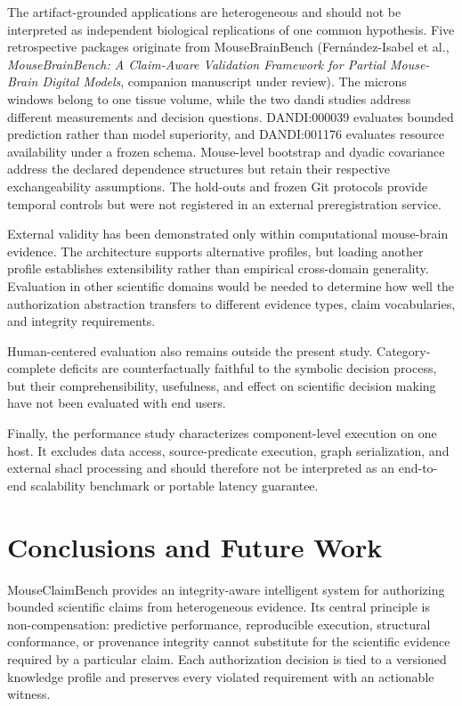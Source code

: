 \documentclass[11pt,a4paper]{article}
\newcommand{\MouseBrainBenchCompanion}{Fern\'andez-Isabel et al., \emph{MouseBrainBench: A Claim-Aware Validation Framework for Partial Mouse-Brain Digital Models}, companion manuscript under review}
\begin{document}
The artifact-grounded applications are heterogeneous and should not be
interpreted as independent biological replications of one common hypothesis.
Five retrospective packages originate from MouseBrainBench
(\MouseBrainBenchCompanion). The \ac{microns} windows belong
to one tissue volume, while the two \ac{dandi} studies address different
measurements and decision questions. DANDI:000039 evaluates bounded
prediction rather than model superiority, and DANDI:001176 evaluates
resource availability under a frozen schema. Mouse-level bootstrap and
dyadic covariance address the declared dependence structures but retain their
respective exchangeability assumptions. The hold-outs and frozen Git
protocols provide temporal controls but were not registered in an external
preregistration service.

External validity has been demonstrated only within computational
mouse-brain evidence. The architecture supports alternative profiles, but
loading another profile establishes extensibility rather than empirical
cross-domain generality. Evaluation in other scientific domains would be
needed to determine how well the authorization abstraction transfers to
different evidence types, claim vocabularies, and integrity requirements.

Human-centered evaluation also remains outside the present study.
Category-complete deficits are counterfactually faithful to the symbolic
decision process, but their comprehensibility, usefulness, and effect on
scientific decision making have not been evaluated with end users.

Finally, the performance study characterizes component-level execution on one
host. It excludes data access, source-predicate execution, graph
serialization, and external \ac{shacl} processing and should therefore not be
interpreted as an end-to-end scalability benchmark or portable latency
guarantee.



\section{Conclusions and Future Work}
\label{sec:conclusions}
MouseClaimBench provides an integrity-aware intelligent system for authorizing bounded scientific claims from heterogeneous evidence. Its central principle is non-compensation: predictive performance, reproducible execution, structural conformance, or provenance integrity cannot substitute for the scientific evidence required by a particular claim. Each authorization decision is tied to a versioned knowledge profile and preserves every violated requirement with an actionable witness.
\end{document}
